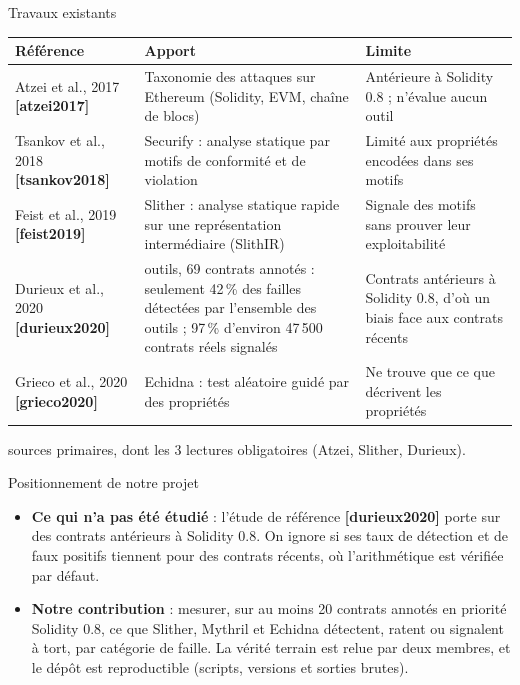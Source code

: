 \documentclass[11pt,aspectratio=169]{beamer}
\newcommand{\refcite}[1]{\textbf{[#1]}}
\begin{document}
\begin{frame}{Travaux existants}
  \scriptsize
  \renewcommand{\arraystretch}{1.15}
  \begin{tabularx}{\textwidth}{@{}>{\raggedright\arraybackslash}p{2.9cm}>{\raggedright\arraybackslash}X>{\raggedright\arraybackslash}p{4.6cm}@{}}
    \toprule
    Référence & Apport & Limite \\
    \midrule
    Atzei et al., 2017 \refcite{atzei2017} & Taxonomie des attaques sur Ethereum (Solidity, EVM, chaîne de blocs) & Antérieure à Solidity 0.8 ; n'évalue aucun outil \\
    Tsankov et al., 2018 \refcite{tsankov2018} & Securify : analyse statique par motifs de conformité et de violation & Limité aux propriétés encodées dans ses motifs \\
    Feist et al., 2019 \refcite{feist2019} & Slither : analyse statique rapide sur une représentation intermédiaire (SlithIR) & Signale des motifs sans prouver leur exploitabilité \\
    Durieux et al., 2020 \refcite{durieux2020} & 9 outils, 69 contrats annotés : seulement 42\,\% des failles détectées par l'ensemble des outils ; 97\,\% d'environ 47\,500 contrats réels signalés & Contrats antérieurs à Solidity 0.8, d'où un biais face aux contrats récents \\
    Grieco et al., 2020 \refcite{grieco2020} & Echidna : test aléatoire guidé par des propriétés & Ne trouve que ce que décrivent les propriétés \\
    \bottomrule
  \end{tabularx}

  \vspace{4pt}
   sources primaires, dont les 3 lectures obligatoires (Atzei, Slither, Durieux).
\end{frame}

\begin{frame}{Positionnement de notre projet}
  \begin{itemize}
    \item \textbf{Ce qui n'a pas été étudié} : l'étude de référence \refcite{durieux2020} porte sur des contrats antérieurs à Solidity 0.8. On ignore si ses taux de détection et de faux positifs tiennent pour des contrats récents, où l'arithmétique est vérifiée par défaut.
    \item \textbf{Notre contribution} : mesurer, sur au moins 20 contrats annotés en priorité Solidity 0.8, ce que Slither, Mythril et Echidna détectent, ratent ou signalent à tort, par catégorie de faille. La vérité terrain est relue par deux membres, et le dépôt est reproductible (scripts, versions et sorties brutes).
  \end{itemize}
\end{frame}
\end{document}
